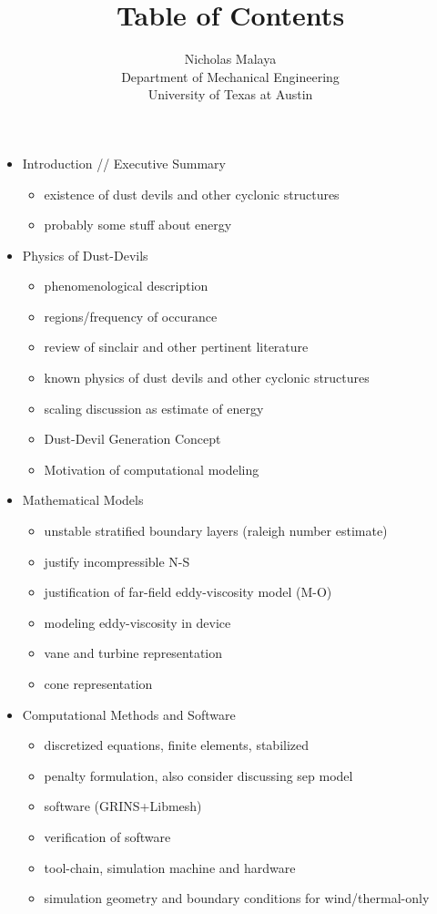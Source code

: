\documentclass{article}
\title{\bf{Table of Contents}}
\author{Nicholas Malaya \\ Department of Mechanical Engineering \\ University of Texas at Austin} \date{}
\begin{document}
\maketitle

\begin{itemize}
 \item Introduction // Executive Summary
       \begin{itemize}
	\item existence of dust devils and other cyclonic structures
	\item probably some stuff about energy
       \end{itemize}

 \item Physics of Dust-Devils
       \begin{itemize} 
	\item phenomenological description
	\item regions/frequency of occurance
	\item review of sinclair and other pertinent literature
        \item known physics of dust devils and other cyclonic structures
	\item scaling discussion as estimate of energy
	\item Dust-Devil Generation Concept
	\item Motivation of computational modeling
       \end{itemize}

 \item Mathematical Models
       \begin{itemize}
	\item unstable stratified boundary layers (raleigh number estimate)
	\item justify incompressible N-S
	\item justification of far-field eddy-viscosity model (M-O)
	\item modeling eddy-viscosity in device 
	\item vane and turbine representation
	\item cone representation
       \end{itemize}

 \item Computational Methods and Software
       \begin{itemize}
	\item discretized equations, finite elements, stabilized
	\item penalty formulation, also consider discussing sep model
	\item software (GRINS+Libmesh)
	\item verification of software
	\item tool-chain, simulation machine and hardware
	\item simulation geometry and boundary conditions for wind/thermal-only
       \end{itemize}


\end{itemize}
\end{document}
